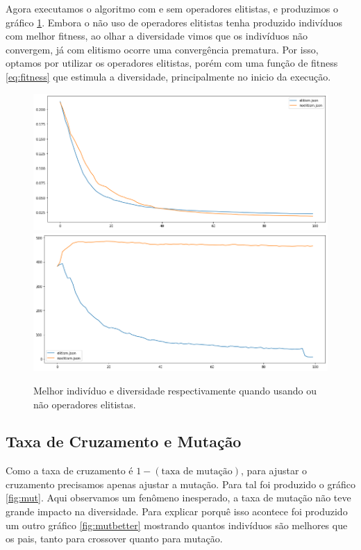 \documentclass[10pt,twocolumn,letterpaper]{article}
\begin{document}
Agora executamos o algoritmo com e sem operadores elitistas, e produzimos o gráfico \ref{fig:elitism}. Embora o não uso de operadores elitistas tenha produzido indivíduos com melhor fitness, ao olhar a diversidade vimos que os indivíduos não convergem, já com elitismo ocorre uma convergência prematura. Por isso, optamos por utilizar os operadores elitistas, porém com uma função de fitness \ref{eq:fitness} que estimula a diversidade, principalmente no inicio da execução.

\begin{figure}[H]
   \begin{center}
   \includegraphics[width=\linewidth]{elitism_best.png}
   \includegraphics[width=\linewidth]{elitism_div.png}
   \end{center}
      \caption{Melhor indivíduo e diversidade respectivamente quando usando ou não operadores elitistas.}
      \label{fig:elitism}
\end{figure}

\subsection{Taxa de Cruzamento e Mutação}

Como a taxa de cruzamento é $1 - (\text{taxa de mutação})$, para ajustar o cruzamento precisamos apenas ajustar a mutação. Para tal foi produzido o gráfico \ref{fig:mut}. Aqui observamos um fenômeno inesperado, a taxa de mutação não teve grande impacto na diversidade. Para explicar porquê isso acontece foi produzido um outro gráfico \ref{fig:mutbetter} mostrando quantos indivíduos são melhores que os pais, tanto para crossover quanto para mutação.
\end{document}
